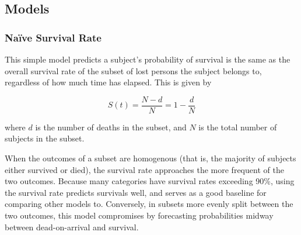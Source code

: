 \documentclass[12pt,titlepage]{article}
\begin{document}


    \subsection{Models}
      \subsubsection{Na{\"i}ve Survival Rate}
        This simple model predicts a subject's probability of survival is the
        same as the overall survival rate of the subset of lost persons the
        subject belongs to, regardless of how much time has elapsed. This is
        given by

        $$S(t) = \frac{N - d}{N} = 1 - \frac{d}{N}$$

        where $d$ is the number of deaths in the subset, and $N$ is the total
        number of subjects in the subset.

        When the outcomes of a subset are homogenous (that is, the majority of
        subjects either survived or died), the survival rate approaches the
        more frequent of the two outcomes. Because many categories have
        survival rates exceeding 90\%, using the survival rate predicts
        survivals well, and serves as a good baseline for comparing other
        models to. Conversely, in subsets more evenly split between the two
        outcomes, this model compromises by forecasting probabilities midway
        between dead-on-arrival and survival.
\end{document}
